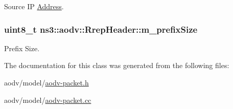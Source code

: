 Source IP \hyperlink{classns3_1_1Address}{Address}. 

\subsubsection[{\texorpdfstring{m\+\_\+prefix\+Size}{m_prefixSize}}]{\setlength{\rightskip}{0pt plus 5cm}uint8\+\_\+t ns3\+::aodv\+::\+Rrep\+Header\+::m\+\_\+prefix\+Size\hspace{0.3cm}{\ttfamily [private]}}\hypertarget{classns3_1_1aodv_1_1RrepHeader_ad61022220a19231c0ebee9cd88e03d75}{}\label{classns3_1_1aodv_1_1RrepHeader_ad61022220a19231c0ebee9cd88e03d75}


Prefix Size. 



The documentation for this class was generated from the following files\+:\begin{DoxyCompactItemize}
\item 
aodv/model/\hyperlink{aodv-packet_8h}{aodv-\/packet.\+h}\item 
aodv/model/\hyperlink{aodv-packet_8cc}{aodv-\/packet.\+cc}\end{DoxyCompactItemize}

